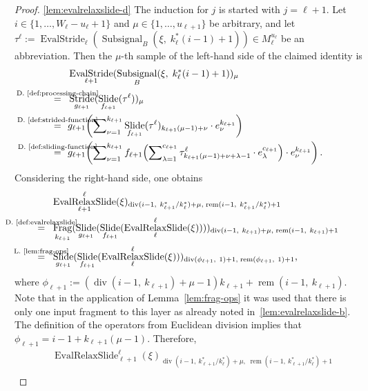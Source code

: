 \documentclass[journal]{IEEEtran}
\newcommand{\ROI}{B}
\newcommand{\discint}[2]{\{#1,\dotsc,#2\}}
\newcommand{\inint}[2]{\in\discint{#1}{#2}}
\DeclareMathOperator{\Subsignal}{Subsignal}
\DeclareMathOperator{\Slide}{Slide}
\DeclareMathOperator{\Stride}{Stride}
\DeclareMathOperator{\Fragmentation}{Frag}
\DeclareMathOperator{\EvalStride}{EvalStride}
\renewcommand{\div}[2]{\operatorname{div}(#1,\ #2)}
\newcommand{\rem}[2]{\operatorname{rem}(#1,\ #2)}
\newcommand{\equsing}[1]{\overset{\mathclap{\text{#1}}}{=}}
\DeclareMathOperator{\EvalRelaxSlide}{EvalRelaxSlide}
\begin{document}
\begin{proof}
\ref{lem:evalrelaxslide-d}
The induction for $j$ is started with $j = \ell + 1$.
Let $i\inint{1}{W_\ell - u_\ell + 1}$ and $\mu\inint{1}{u_{\ell + 1}}$ be arbitrary, and let $\tau^\ell := \EvalStride_\ell(\Subsignal_\ROI(\xi,\; k_\ell^*(i - 1) + 1))\in M_\ell^{u_\ell}$ be an abbreviation.
Then the $\mu$-th sample of the left-hand side of the claimed identity is
\begin{align*}
  & \EvalStride_{\ell + 1}(\Subsignal_\ROI(\xi,\; k_\ell^*(i - 1) + 1))_\mu\\
  \equsing{D.~\ref{def:processing-chain}}\ \ & \Stride_{g_{\ell + 1}}(\Slide_{f_{\ell + 1}}(\tau^\ell))_\mu\\
  \equsing{D.~\ref{def:strided-function}}\ \ & g_{\ell + 1}\!\left( \sum\nolimits_{\nu = 1}^{k_{\ell + 1}} \Slide_{f_{\ell + 1}}(\tau^\ell)_{k_{\ell + 1}(\mu - 1) + \nu}\cdot e_\nu^{k_{\ell + 1}} \right)\\
    \equsing{D.~\ref{def:sliding-function}}\ \ & g_{\ell + 1}\!\left( \sum\nolimits_{\nu = 1}^{k_{\ell + 1}} f_{\ell + 1}\!\left( \sum\nolimits_{\lambda = 1}^{c_{\ell + 1}} \tau^\ell_{k_{\ell + 1}(\mu - 1) + \nu + \lambda - 1}\cdot e_\lambda^{c_{\ell + 1}} \right) \cdot e_\nu^{k_{\ell + 1}} \right)\text{.}
\end{align*}
Considering the right-hand side, one obtains
\begin{align*}
  & \EvalRelaxSlide_{\ell + 1}^\ell(\xi)_{\div{i - 1}{k_{\ell + 1}^* / k_\ell^*} + \mu,\;\rem{i - 1}{k_{\ell + 1}^* / k_\ell^*} + 1}\\
  \equsing{D.~\ref{def:evalrelaxslide}}\ \ & \Fragmentation_{k_{\ell + 1}}(\Slide_{g_{\ell + 1}}(\Slide_{f_{\ell + 1}}(\EvalRelaxSlide_\ell^\ell(\xi))))_{\div{i - 1}{k_{\ell + 1}} + \mu,\;\rem{i - 1}{k_{\ell + 1}} + 1}\\
  \equsing{L.~\ref{lem:frag-ops}}\ \ & \Slide_{g_{\ell + 1}}(\Slide_{f_{\ell + 1}}(\EvalRelaxSlide_\ell^\ell(\xi)))_{\div{\phi_{\ell + 1}}{1} + 1,\;\rem{\phi_{\ell + 1}}{1} + 1}\text{,}
\end{align*}
where $\phi_{\ell + 1} := (\div{i - 1}{k_{\ell + 1}} + \mu - 1)k_{\ell + 1} + \rem{i - 1}{k_{\ell + 1}}$.
Note that in the application of Lemma~\ref{lem:frag-ops} it was used that there is only one input fragment to this layer as already noted in~\ref{lem:evalrelaxslide-b}.
The definition of the operators from Euclidean division implies that $\phi_{\ell + 1} = i - 1 + k_{\ell + 1}(\mu - 1)$.
Therefore,
\begin{align*}
  & \EvalRelaxSlide_{\ell + 1}^\ell(\xi)_{\div{i - 1}{k_{\ell + 1}^* / k_\ell^*} + \mu,\;\rem{i - 1}{k_{\ell + 1}^* / k_\ell^*} + 1}\\

\end{align*}
\end{proof}
\end{document}
